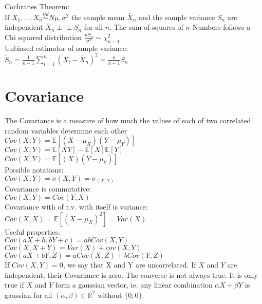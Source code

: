 Cochranes Theorem:\\

If $X_1, ..., X_n \stackrel{iid}{\sim} N{\mu,\sigma^2}$ the sample mean $\bar{X}_n$ and the sample variance $S_n$ are independent $\bar{X}_n \perp \!\!\! \perp S_n$ for all $n$. The sum of squares of $n$ Numbers follows a Chi squared distribution $\frac{n S_ n}{\sigma ^2} \sim \chi _{n -1}^2$\\

Unbiased estimator of sample variance:\\

$\tilde{S}_n= \displaystyle  \frac{1}{n-1} \sum _{i=1}^ n \left(X_ i - \overline{X}_ n\right)^2 = \frac{n}{n-1} S_n$\\

\section{Covariance}

The Covariance is a measure of how much the values of each of two correlated random variables determine each other\\

$Cov(X,Y) = \mathbb E[(X - \mu _ X)(Y - \mu _ Y)]$ \\

$Cov(X,Y) = \mathbb E[XY] - \mathbb E[X]\mathbb E[Y] $\\

$ Cov(X,Y)= \displaystyle  \mathbb E[(X)(Y-\mu _ Y)]$\\

Possible notations:\\

$Cov(X,Y) = \sigma(X,Y) = \sigma_ {(X,Y)}$\\

Covariance is commutative:\\

$Cov(X,Y) = Cov(Y,X)$\\

Covariance with of r.v. with itself is variance:\\

$Cov(X,X) = \mathbb E[(X - \mu _ X)^2] = Var(X)$\\

Useful properties:\\

$Cov(aX + h,bY + c)= abCov(X,Y)$\\

$Cov(X,X + Y)= Var(X) + cov(X,Y)$\\

$\displaystyle  Cov(aX+ bY, Z) \displaystyle = aCov(X,Z) + bCov(Y,Z)$\\

If $Cov(X,Y) = 0$, we say that X and Y are uncorrelated. If $X$ and $Y$ are independent, their Covariance is zero. The converse is not always true. It is only true if $X$ and $Y$ form a gaussian vector, ie. any linear combination $\alpha X + \beta Y$ is gaussian for all $(\alpha,\beta) \in \mathbb{R}^2$ without $\{0,0\}$.